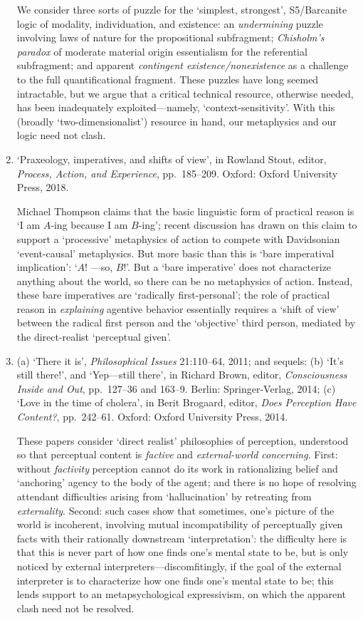 \documentclass[12pt]{article}
\begin{document}
\begin{enumerate}
	We consider three sorts of puzzle for the `simplest, strongest', S5/Barcanite logic of modality, individuation, and existence: an \emph{undermining} puzzle involving laws of nature for the propositional subfragment; \emph{Chisholm's paradox} of moderate material origin essentialism for the referential subfragment; and apparent \emph{contingent existence/nonexistence} as a challenge to the full quantificational fragment. These puzzles have long seemed intractable, but we argue that a critical technical resource, otherwise needed, has been inadequately exploited---namely, `context-sensitivity'. With this (broadly `two-dimensionalist') resource in hand, our metaphysics and our logic need not clash.
	
	\item `Praxeology, imperatives, and shifts of view', in Rowland Stout, editor, \emph{Process, Action, and Experience}, pp.~185--209. Oxford: Oxford University Press, 2018.
	
	Michael Thompson claims that the basic linguistic form of practical reason is `I am $A$-ing because I am $B$-ing'; recent discussion has drawn on this claim to support a `processive' metaphysics of action to compete with Davidsonian `event-causal' metaphysics. But more basic than this is `bare imperatival implication': `$A$! ---so, $B$!'. But a `bare imperative' does not characterize anything about the world, so there can be no metaphysics of action. Instead, these bare imperatives are `radically first-personal'; the role of practical reason in \emph{explaining} agentive behavior essentially requires a `shift of view' between the radical first person and the `objective' third person, mediated by the direct-realist `perceptual given'.
	
	\item (a) `There it is', \emph{Philosophical Issues} 21:110--64, 2011; and sequels: (b) `It's still there!', and `Yep---still there', in Richard Brown, editor, \emph{Consciousness Inside and Out}, pp.~127--36 and 163--9. Berlin: Springer-Verlag, 2014; (c) `Love in the time of cholera', in Berit Brogaard, editor, \emph{Does Perception Have Content?}, pp.~242--61. Oxford: Oxford University Press, 2014.
	
	These papers consider `direct realist' philosophies of perception, understood so that perceptual content is \emph{factive} and \emph{external-world concerning}. First: without \emph{factivity} perception cannot do its work in rationalizing belief and `anchoring' agency to the body of the agent; and there is no hope of resolving attendant difficulties arising from `hallucination' by retreating from \emph{externality}. Second: such cases show that sometimes, one's picture of the world is incoherent, involving mutual incompatibility of perceptually given facts with their rationally downstream `interpretation': the difficulty here is that this is never part of how one finds one's mental state to be, but is only noticed by external interpreters---discomfitingly, if the goal of the external interpreter is to characterize how one finds one's mental state to be; this lends support to an metapsychological expressivism, on which the apparent clash need not be resolved.
	

\end{enumerate}
\end{document}
